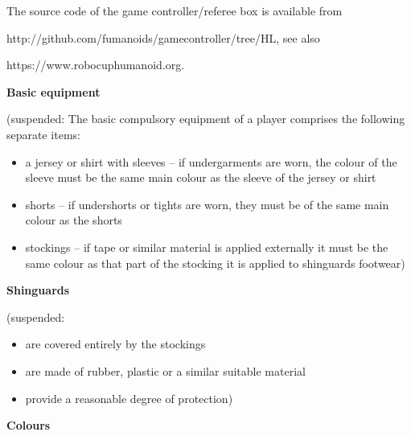 \bigskip

The source code of the game controller/referee box is available from 

\textcolor[rgb]{0.0,0.0,0.49803922}{http://github.com/fumanoids/gamecontroller/tree/HL},
see also 

\textcolor[rgb]{0.0,0.0,0.49803922}{https://www.robocuphumanoid.org}.

\bigskip

{\bfseries Basic equipment}

\headlinebox

{\color[rgb]{0.4,0.4,0.4}
(suspended: The basic compulsory equipment of a player comprises the following separate items:

\begin{itemize}
\item a jersey or shirt with sleeves -- if undergarments are worn, the colour of the sleeve must be the same main colour as the sleeve of the jersey or shirt 
\item shorts -- if undershorts or tights are worn, they must be of the same main colour as the shorts
\item stockings -- if tape or similar material is applied externally it must be the same colour as that part of the stocking it is applied to shinguards footwear) 
\end{itemize}
}

\bigskip

{\bfseries Shinguards}

\headlinebox

{\color[rgb]{0.4,0.4,0.4}
(suspended:

\begin{itemize}
\item are covered entirely by the stockings
\item are made of rubber, plastic or a similar suitable material 
\item provide a reasonable degree of protection)
\end{itemize}
}

\bigskip

{\bfseries Colours}

\headlinebox

